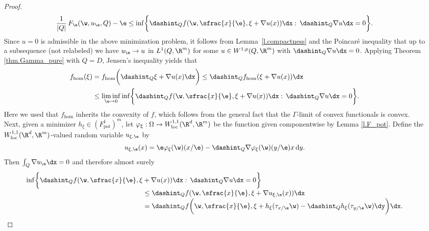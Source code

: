 \begin{proof}
\begin{equation*}
\frac{1}{|Q|}\,F_{\e}(\w,u_{\e},Q)-\e\leq\inf\biggl\{\dashint_Q f(\w,\sfrac{x}{\e},\xi+\nabla u(x))\dx:\,\dashint_Q\nabla u\dx=0\biggr\}.
\end{equation*}
Since $u=0$ is admissible in the above minimization problem, it follows from Lemma~\ref{l.compactness} and the Poincaré inequality that up to a subsequence (not relabeled) we have $u_{\e}\to u$ in $L^1(Q,\R^m)$ for some $u\in W^{1,p}(Q,\R^m)$ with $\dashint_Q\nabla u\dx=0$. Applying Theorem \ref{thm.Gamma_pure} with $Q=D$, Jensen's inequality yields that\vspace*{-3pt}
\begin{equation}
\begin{aligned}\label{eq:zero_average_gradient}
f_{\hom}(\xi)&=f_{\hom}\biggl(\dashint_Q\xi+\nabla u(x)\dx\biggr)\leq \dashint_Q f_{\hom}(\xi+\nabla u(x))\dx
\\
&\leq \liminf_{\e\to 0}\inf\biggl\{\dashint_Q f(\w,\sfrac{x}{\e},\xi+\nabla u(x))\dx:\,\dashint_Q \nabla u\dx=0\biggr\}.
\end{aligned}
\end{equation}
Here we used that $f_{\hom}$ inherits the convexity of $f$, which follows from the general fact that the $\Gamma$-limit of convex functionals is convex. Next, given a minimizer $h_{\xi}\in (F_\mathrm{pot}^1)^m$, let $\varphi_{\xi}:\Omega\to W^{1,1}_\mathrm{loc}(\R^d,\R^m)$ be the function given componentwise by Lemma \ref{l.F_pot}. Define the $W^{1,1}_\mathrm{loc}(\R^d,\R^m)$-valued random variable $u_{\xi,\e}$ by\vspace*{-3pt}
\begin{equation*}
u_{\xi,\e}(x)=\e\varphi_{\xi}(\w)(x/\e)-\dashint_{Q}\nabla\varphi_{\xi}(\w)(y/\e)x\,\mathrm{d}y.
\end{equation*}
Then $\int_Q\nabla u_{\e}\dx=0$ and therefore almost surely\vspace*{-5pt}
\begin{equation}
\begin{split}\label{eq:corrector_good}
\inf\biggl\{\dashint_Q f(\w,\sfrac{x}{\e},\xi&+\nabla u(x))\dx:\,\dashint_Q\nabla u\dx=0\biggr\}\\[-3pt]
&\leq \dashint_Qf(\w,\sfrac{x}{\e},\xi+\nabla u_{\xi,\e}(x))\dx
\\[-3pt]
&=\dashint_Q f\biggl(\w,\sfrac{x}{\e},\xi+h_{\xi}(\tau_{x/\e}\w)-\dashint_Qh_{\xi}(\tau_{y/\e}\w)\dy\biggr)\dx.
\end{split}
\end{equation}

\end{proof}
